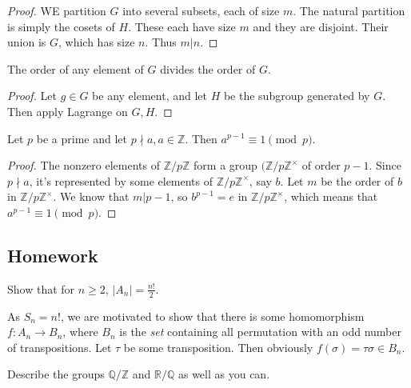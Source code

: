 \documentclass{scrartcl}
\begin{document}
\begin{proof}
    WE partition $G$ into several subsets, each of size $m$. The natural partition is simply the cosets of $H$. These each have size $m$ and they are disjoint. Their union is $G$, which has size $n$. Thus $m | n$.
\end{proof}

\begin{corollary}
    The order of any element of $G$ divides the order of $G$.
\end{corollary}

\begin{proof}
    Let $g \in G$ be any element, and let $H$ be the subgroup generated by $G$. Then apply Lagrange on $G, H$.
\end{proof}

\begin{theorem}
    Let $p$ be a prime and let $p \nmid a, a \in \mathbb{Z}$. Then $a^{p-1} \equiv 1 \pmod p$.
\end{theorem}

\begin{proof}
    The nonzero elements of $\mathbb{Z}/p\mathbb{Z}$ form a group $(\mathbb{Z}/p\mathbb{Z}^\times$ of order $p-1$. Since $p \nmid a$, it's represented by some elements of $\mathbb{Z}/p\mathbb{Z}^\times$, say $b$. Let $m$ be the order of $b$ in $\mathbb{Z}/p\mathbb{Z}^\times$. We know that $m | p-1$, so $b^{p-1} = e$ in $\mathbb{Z}/p\mathbb{Z}^\times$, which means that $a^{p-1} \equiv 1 \pmod p$.
\end{proof}

\newpage
\subsection{Homework}

\begin{problem}[1]
    Show that for $n \ge 2$, $|A_n| = \frac{n!}{2}$.
\end{problem}

\begin{soln}
    As $S_n = n!$, we are motivated to show that there is some homomorphism $f : A_n \rightarrow B_n$, where $B_n$ is the \textit{set} containing all permutation with an odd number of transpositions. Let $\tau$ be some transposition. Then obviously $f(\sigma) = \tau \sigma \in B_n$.
\end{soln}

\begin{problem}[2]
    Describe the groups $\mathbb{Q} / \mathbb{Z}$ and $\mathbb{R} / \mathbb{Q}$ as well as you can.
\end{problem}
\end{document}
